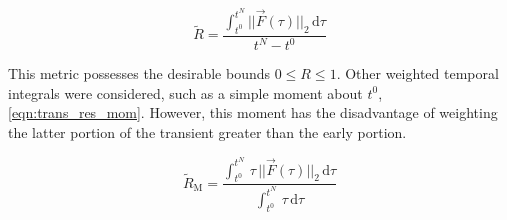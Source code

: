 \begin{equation}
\label{eqn:trans_res_ave}
\tilde{R} = \frac{\int_{t^{0}}^{t^{N}} ||\vec{F}(\tau)||_2 \,\mathrm{d} \tau}{t^{N} - t^{0}}
\end{equation}

This metric possesses the desirable bounds $0 \leq R \leq 1$.
Other weighted temporal integrals were considered, such as a simple moment about $t^{0}$, \eqref{eqn:trans_res_mom}.
However, this moment has the disadvantage of weighting the latter portion of the transient greater than the early portion.

\begin{equation}
\label{eqn:trans_res_mom}
\tilde{R}_{\text{M}} = \frac{\int_{t^{0}}^{t^{N}} \,\tau\,||\vec{F}(\tau)||_2 \,\mathrm{d} \tau}{\int_{t^{0}}^{t^{N}} \,\tau \,\mathrm{d} \tau}
\end{equation}